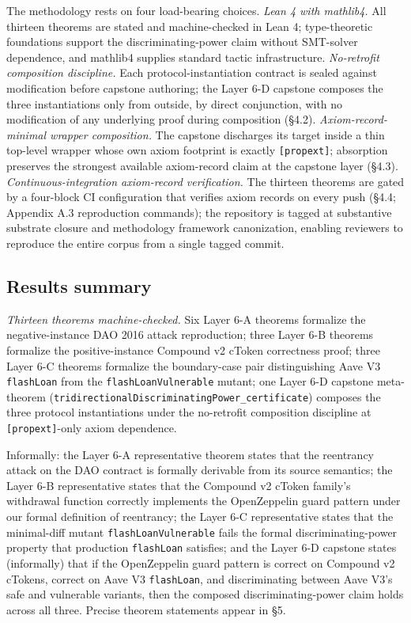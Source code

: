 The methodology rests on four load-bearing choices. \emph{Lean 4 with
mathlib4.} All thirteen theorems are stated and machine-checked in Lean
4; type-theoretic foundations support the discriminating-power claim
without SMT-solver dependence, and mathlib4 supplies standard tactic
infrastructure. \emph{No-retrofit composition discipline.} Each
protocol-instantiation contract is sealed against modification before
capstone authoring; the Layer 6-D capstone composes the three
instantiations only from outside, by direct conjunction, with no
modification of any underlying proof during composition (§4.2).
\emph{Axiom-record-minimal wrapper composition.} The capstone discharges
its target inside a thin top-level wrapper whose own axiom footprint is
exactly \texttt{{[}propext{]}}; absorption preserves the strongest
available axiom-record claim at the capstone layer (§4.3).
\emph{Continuous-integration axiom-record verification.} The thirteen
theorems are gated by a four-block CI configuration that verifies axiom
records on every push (§4.4; Appendix A.3 reproduction commands); the
repository is tagged at substantive substrate closure and methodology
framework canonization, enabling reviewers to reproduce the entire
corpus from a single tagged commit.

\subsection{Results summary}\label{results-summary}

\emph{Thirteen theorems machine-checked.} Six Layer 6-A theorems
formalize the negative-instance DAO 2016 attack reproduction; three
Layer 6-B theorems formalize the positive-instance Compound v2 cToken
correctness proof; three Layer 6-C theorems formalize the boundary-case
pair distinguishing Aave V3 \texttt{flashLoan} from the
\texttt{flashLoanVulnerable} mutant; one Layer 6-D capstone meta-theorem
(\texttt{tridirectionalDiscriminatingPower\_certificate}) composes the
three protocol instantiations under the no-retrofit composition
discipline at \texttt{{[}propext{]}}-only axiom dependence.

Informally: the Layer 6-A representative theorem states that the
reentrancy attack on the DAO contract is formally derivable from its
source semantics; the Layer 6-B representative states that the Compound
v2 cToken family's withdrawal function correctly implements the
OpenZeppelin guard pattern under our formal definition of reentrancy;
the Layer 6-C representative states that the minimal-diff mutant
\texttt{flashLoanVulnerable} fails the formal discriminating-power
property that production \texttt{flashLoan} satisfies; and the Layer 6-D
capstone states (informally) that if the OpenZeppelin guard pattern is
correct on Compound v2 cTokens, correct on Aave V3 \texttt{flashLoan},
and discriminating between Aave V3's safe and vulnerable variants, then
the composed discriminating-power claim holds across all three. Precise
theorem statements appear in §5.

